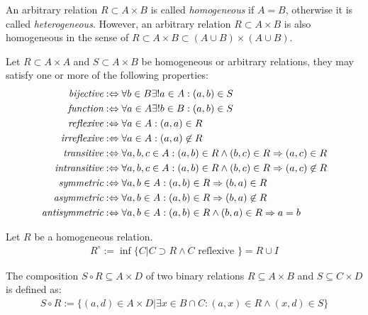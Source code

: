 An arbitrary relation $R \subset A \times B$ is called \emph{homogeneous} if $A = B$, otherwise it is called \emph{heterogeneous}.
However, an arbitrary relation $R \subset A \times B$ is also homogeneous in the sense of
$R \subset A \times B \subset (A \cup B) \times (A \cup B)$.

\begin{definition}
Let $R \subset A \times A$ and $S \subset A \times B$ be homogeneous or arbitrary relations, they may satisfy one or more of the following properties:
\begin{align}
\emph{bijective} 
&:\Leftrightarrow
\forall b \in B \exists! a \in A: (a,b) \in S
\\
\emph{function} 
&:\Leftrightarrow
\forall a \in A \exists! b \in B: (a,b) \in S
\\
\emph{reflexive} 
&:\Leftrightarrow
\forall a \in A: (a,a) \in R
\\
\emph{irreflexive} 
&:\Leftrightarrow
\forall a \in A: (a,a) \not\in R
\\
\emph{transitive} 
&:\Leftrightarrow
\forall a,b,c \in A: (a,b) \in R \wedge (b,c) \in R \Rightarrow (a,c) \in R
\\
\emph{intransitive} 
&:\Leftrightarrow
\forall a,b,c \in A: (a,b) \in R \wedge (b,c) \in R \Rightarrow (a,c) \not\in R
\\
\emph{symmetric} 
&:\Leftrightarrow
\forall a,b \in A: (a,b) \in R \Rightarrow (b,a) \in R
\\
\emph{asymmetric} 
&:\Leftrightarrow
\forall a,b \in A: (a,b) \in R \Rightarrow (b,a) \not\in R
\\
\emph{antisymmetric} 
&:\Leftrightarrow
\forall a,b \in A: (a,b) \in R \wedge (b,a) \in R \Rightarrow a = b
\end{align}
\end{definition}

\begin{definition}
Let $R$ be a homogeneous relation.
\begin{align}
R^\circ
:= \inf \{ C | C \supset R \wedge C \text{ reflexive } \}
= R \cup I
\end{align}
\end{definition}


\begin{definition}
The composition $S \circ R \subseteq A \times D$ of two binary relations $R \subseteq A \times B$ and $S \subseteq C \times D$ is defined as:
\begin{align}
S \circ R := \{ (a,d) \in A \times D | \exists x \in B \cap C : (a,x) \in R \wedge (x,d) \in S \}
\end{align}
\end{definition}

